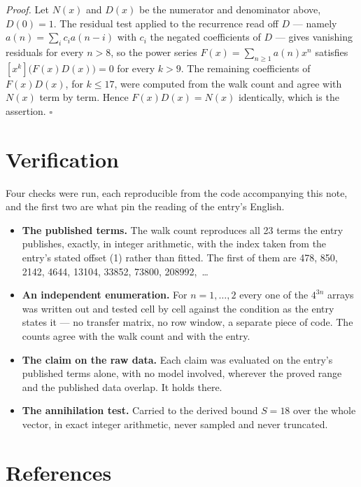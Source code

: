 \documentclass[11pt]{article}
\theoremstyle{definition}
\begin{document}
{\itshape Proof.} Let $N(x)$ and $D(x)$ be the numerator and denominator above, $D(0)=1$. The residual test applied to the recurrence read off $D$ --- namely $a(n) = \sum_i c_i a(n-i)$ with $c_i$ the negated coefficients of $D$ --- gives vanishing residuals for every $n > 8$, so the power series $F(x)=\sum_{n\ge 1}a(n)x^n$ satisfies $[x^k]\bigl(F(x)D(x)\bigr) = 0$ for every $k > 9$. The remaining coefficients of $F(x)D(x)$, for $k \le 17$, were computed from the walk count and agree with $N(x)$ term by term. Hence $F(x)D(x) = N(x)$ identically, which is the assertion. $\square$

\section{Verification}

Four checks were run, each reproducible from the code accompanying this note, and the first two are what pin the reading of the entry's English.

\begin{itemize}

\item {\bfseries The published terms.} The walk count reproduces all 23 terms the entry publishes, exactly, in integer arithmetic, with the index taken from the entry's stated offset (1) rather than fitted. The first of them are 478, 850, 2142, 4644, 13104, 33852, 73800, 208992,~\dots

\item {\bfseries An independent enumeration.} For $n = 1,\dots,2$ every one of the $4^{3n}$ arrays was written out and tested cell by cell against the condition as the entry states it --- no transfer matrix, no row window, a separate piece of code. The counts agree with the walk count and with the entry.

\item {\bfseries The claim on the raw data.} Each claim was evaluated on the entry's published terms alone, with no model involved, wherever the proved range and the published data overlap. It holds there.

\item {\bfseries The annihilation test.} Carried to the derived bound $S = 18$ over the whole vector, in exact integer arithmetic, never sampled and never truncated.

\end{itemize}

\section{References}
\end{document}
